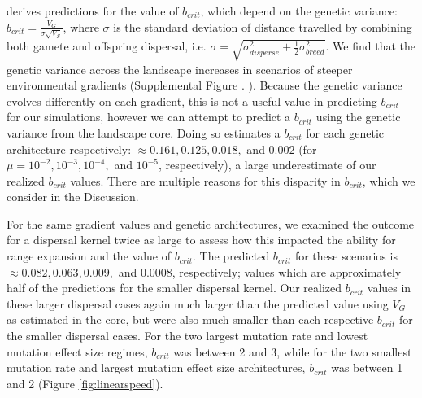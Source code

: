 \citet{Barton:2001} derives predictions for the value of $b_{crit}$, which depend on the genetic variance: $b_{crit} = \frac{V_G}{\sigma \sqrt{V_S}}$, where $\sigma$ is the standard deviation of distance travelled by combining both gamete and offspring dispersal, i.e. $\sigma = \sqrt{\sigma_{disperse}^2 + \frac{1}{2}\sigma_{breed}^2}$. We find that the genetic variance across the landscape increases in scenarios of steeper environmental gradients (Supplemental Figure . ). Because the genetic variance evolves differently on each gradient, this is not a useful value in predicting $b_{crit}$ for our simulations, however we can attempt to predict a $b_{crit}$ using the genetic variance from the landscape core. Doing so estimates a $b_{crit}$ for each genetic architecture respectively: $\approx 0.161, 0.125, 0.018,$ and $0.002$ (for $\mu = 10^{-2}, 10^{-3}, 10^{-4},$ and $10^{-5}$, respectively), a large underestimate of our realized $b_{crit}$ values. There are multiple reasons for this disparity in $b_{crit}$, which we consider in the Discussion.

For the same gradient values and genetic architectures, we examined the outcome for a dispersal kernel twice as large to assess how this impacted the ability for range expansion and the value of $b_{crit}$. The predicted $b_{crit}$ for these scenarios is $\approx 0.082, 0.063, 0.009,$ and $0.0008$, respectively; values which are approximately half of the predictions for the smaller dispersal kernel. Our realized $b_{crit}$ values in these larger dispersal cases again much larger than the predicted value using $V_G$ as estimated in the core, but were also much smaller than each respective $b_{crit}$ for the smaller dispersal cases. For the two largest mutation rate and lowest mutation effect size regimes, $b_{crit}$ was between 2 and 3, while for the two smallest mutation rate and largest mutation effect size architectures, $b_{crit}$ was between 1 and 2 (Figure \ref{fig:linearspeed}).







